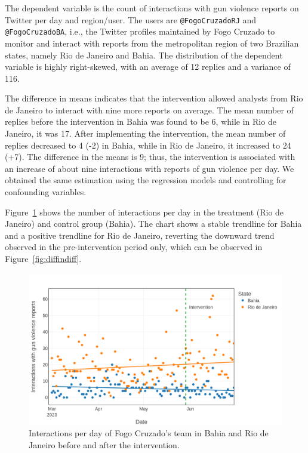 \documentclass[11pt,letterpaper]{article}
\begin{document}
The dependent variable is the count of interactions with gun violence reports on Twitter per day and region/user. The users are \nolinkurl{@FogoCruzadoRJ} and \nolinkurl{@FogoCruzadoBA}, i.e., the Twitter profiles maintained by Fogo Cruzado to monitor and interact with reports from the metropolitan region of two Brazilian states, namely Rio de Janeiro and Bahia. The distribution of the dependent variable is highly right-skewed, with an average of 12 replies and a variance of 116.

The difference in means indicates that the intervention allowed analysts from Rio de Janeiro to interact with nine more reports on average. The mean number of replies before the intervention in Bahia was found to be 6, while in Rio de Janeiro, it was 17. After implementing the intervention, the mean number of replies decreased to 4 (-2) in Bahia, while in Rio de Janeiro, it increased to 24 (+7). The difference in the means is 9; thus, the intervention is associated with an increase of about nine interactions with reports of gun violence per day. We obtained the same estimation using the regression models and controlling for confounding variables. 

Figure~\ref{fig:trendline-after} shows the number of interactions per day in the treatment (Rio de Janeiro) and control group (Bahia). The chart shows a stable trendline for Bahia and a positive trendline for Rio de Janeiro, reverting the downward trend observed in the pre-intervention period only, which can be observed in Figure~\ref{fig:diffindiff}.

\begin{figure}[H]
    \centering
    \includegraphics[width=0.8\linewidth]{figs/appendix/regression/trendline-after.png}
    \caption{Interactions per day of Fogo Cruzado's team in Bahia and Rio de Janeiro before and after the intervention.}
    \label{fig:trendline-after}
\end{figure}
\end{document}

